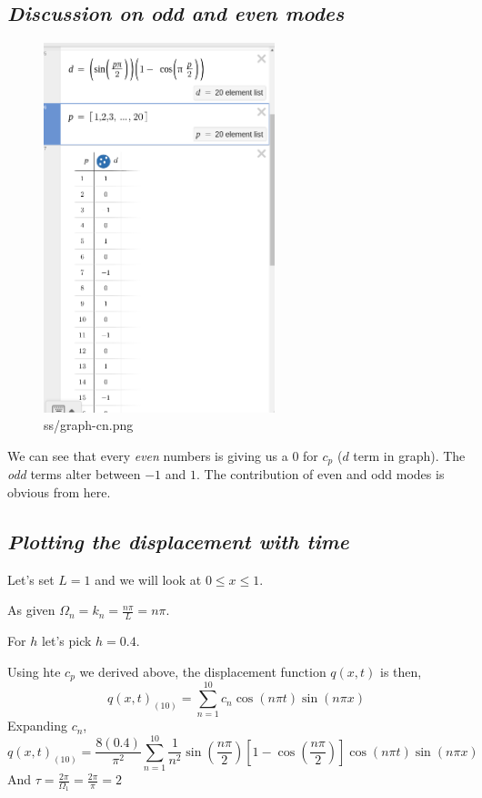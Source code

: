 \documentclass[letter, 10pts]{article}
\begin{document}
\subsection*{\emph{Discussion on odd and even modes}}
\begin{figure}[H]
	\centering
	\includegraphics[width=0.6\textwidth]{../phys311/ss/graph-cn.png}
	\caption{ss/graph-cn.png}
	\label{fig:ss-graph-cn-png}
\end{figure}
We can see that every \emph{even} numbers is giving us a $0$ for $c_p$ ($d$ term in graph). The \emph{odd} terms alter between $-1$ and $1$. The contribution of even and odd modes is obvious from here.   
\subsection*{\emph{Plotting the displacement with time}}
Let's set $L = 1$ and we will look at $0 \le  x \le 1$. 

As given $\Omega_n = k_n = \frac{n\pi}{L} = n \pi $. 

For $h$ let's pick $h = 0.4$. 

Using hte $c_p$ we derived above, the displacement function $q(x,t)$ is then, 
\[
	q(x,t)_{(10)}= 
\sum_{n=1}^{10} c_n \cos ( n \pi t) \sin(n \pi x)
\] 
Expanding $c_n$, 
\[
q(x,t)_{(10)} = \frac{8 (0.4)}{\pi ^2} 
\sum_{n=1}^{10} 
\frac{1}{n^2} \sin \left(\frac{n \pi }{2}\right) 
\left[ 
1 - \cos \left(\frac{n \pi }{2}\right)
\right] 
\cos \left( n \pi t\right) \sin (n \pi x)
\]
And $\tau = \frac{2\pi}{\Omega_1} = \frac{2 \pi }{\pi } = 2$
\end{document}
